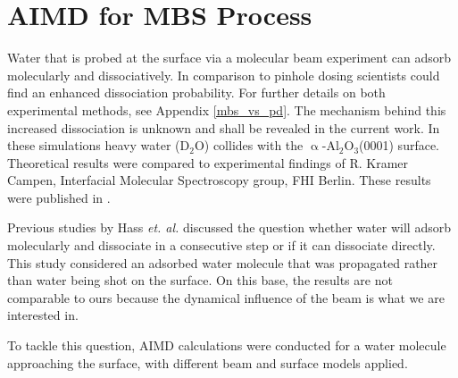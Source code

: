 \documentclass[11pt,DIV=13,BCOR=5mm,a4paper,headinclude]{scrbook}
\begin{document}
  
\section{AIMD for MBS Process}\label{sec_0001AIMD}
Water that is probed at the surface via a molecular beam experiment can adsorb molecularly and dissociatively.
In comparison to pinhole dosing scientists could find an enhanced dissociation probability.
For further details on both experimental methods, see Appendix \ref{mbs_vs_pd}.
The mechanism behind this increased dissociation is unknown and shall be revealed in the current work.
In these simulations heavy water (D$_2$O) collides with the $\upalpha$-Al$_{\text{2}}$O$_{\text{3}}$(0001) surface.
Theoretical results were compared to experimental findings of R. Kramer Campen, Interfacial Molecular Spectroscopy group, FHI Berlin.
These results were published in \cite{Heiden0001_2018}.


Previous studies by Hass \textit{et. al.}\cite{hass98,hass00} discussed the question whether water will adsorb molecularly and dissociate in a consecutive step or if it can dissociate directly.
This study considered an adsorbed water molecule that was propagated rather than water being shot on the surface.
On this base, the results are not comparable to ours because the dynamical influence of the beam is what we are interested in.


To tackle this question, AIMD calculations were conducted for a water molecule approaching the surface, with different beam and surface models applied.
\end{document}
